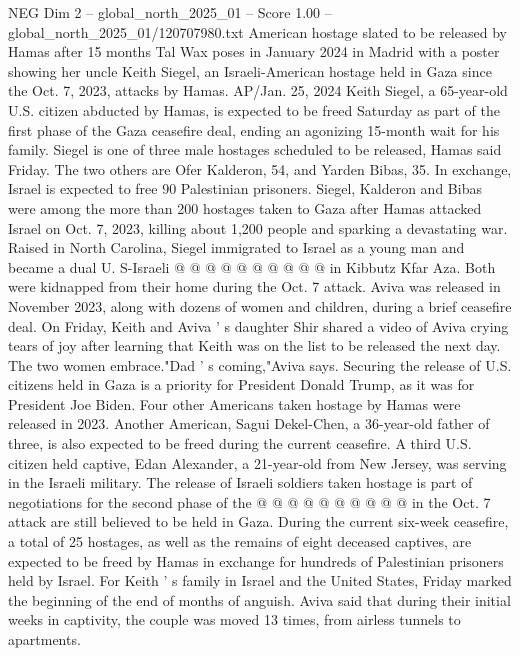 \begin{textsample}{NEG Dim 2 – global\_north\_2025\_01 – Score 1.00 – global\_north\_2025\_01/120707980.txt}  \label{ex:f2_neg_087}
American hostage slated to be released by Hamas after 15 months Tal Wax poses in January 2024 in Madrid with a poster showing her uncle Keith Siegel, an Israeli-American hostage held in Gaza since the Oct. 7, 2023, attacks by Hamas.
AP/Jan. 25, 2024 Keith Siegel, a 65-year-old U.S. citizen abducted by Hamas, is expected to be freed Saturday as part of the first phase of the Gaza ceasefire deal, ending an agonizing 15-month wait for his family.
Siegel is one of three male hostages scheduled to be released, Hamas said Friday.
The two others are Ofer Kalderon, 54, and Yarden Bibas, 35.
In exchange, Israel is expected to free 90 Palestinian prisoners.
Siegel, Kalderon and Bibas were among the more than 200 hostages taken to Gaza after Hamas attacked Israel on Oct. 7, 2023, killing about 1,200 people and sparking a devastating war.
Raised in North Carolina, Siegel immigrated to Israel as a young man and became a dual U.
S-Israeli @ @ @ @ @ @ @ @ @ @ in Kibbutz Kfar Aza.
Both were kidnapped from their home during the Oct. 7 attack.
Aviva was released in November 2023, along with dozens of women and children, during a brief ceasefire deal.
On Friday, Keith and Aviva ' s daughter Shir shared a video of Aviva crying tears of joy after learning that Keith was on the list to be released the next day.
The two women embrace."Dad ' s coming,"Aviva says.
Securing the release of U.S. citizens held in Gaza is a priority for President Donald Trump, as it was for President Joe Biden.
Four other Americans taken hostage by Hamas were released in 2023.
Another American, Sagui Dekel-Chen, a 36-year-old father of three, is also expected to be freed during the current ceasefire.
A third U.S. citizen held captive, Edan Alexander, a 21-year-old from New Jersey, was serving in the Israeli military.
The release of Israeli soldiers taken hostage is part of negotiations for the second phase of the @ @ @ @ @ @ @ @ @ @ in the Oct. 7 attack are still believed to be held in Gaza.
During the current six-week ceasefire, a total of 25 hostages, as well as the remains of eight deceased captives, are expected to be freed by Hamas in exchange for hundreds of Palestinian prisoners held by Israel.
For Keith ' s family in Israel and the United States, Friday marked the beginning of the end of months of anguish.
Aviva said that during their initial weeks in captivity, the couple was moved 13 times, from airless tunnels to apartments.

\end{textsample}
